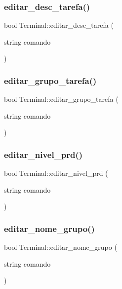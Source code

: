 \subsubsection{\texorpdfstring{editar\+\_\+desc\+\_\+tarefa()}{editar\_desc\_tarefa()}}
{\footnotesize\ttfamily bool Terminal\+::editar\+\_\+desc\+\_\+tarefa (\begin{DoxyParamCaption}\item[{string}]{comando }\end{DoxyParamCaption})}

\mbox{\label{classTerminal_a08b680a0760ae5fbab03fa2098250c7b}} 
\subsubsection{\texorpdfstring{editar\+\_\+grupo\+\_\+tarefa()}{editar\_grupo\_tarefa()}}
{\footnotesize\ttfamily bool Terminal\+::editar\+\_\+grupo\+\_\+tarefa (\begin{DoxyParamCaption}\item[{string}]{comando }\end{DoxyParamCaption})}

\mbox{\label{classTerminal_ad8941034607b656e5dcd279ce35a3f54}} 
\subsubsection{\texorpdfstring{editar\+\_\+nivel\+\_\+prd()}{editar\_nivel\_prd()}}
{\footnotesize\ttfamily bool Terminal\+::editar\+\_\+nivel\+\_\+prd (\begin{DoxyParamCaption}\item[{string}]{comando }\end{DoxyParamCaption})}

\mbox{\label{classTerminal_a542446375398d23c429e38ce92ef2855}} 
\subsubsection{\texorpdfstring{editar\+\_\+nome\+\_\+grupo()}{editar\_nome\_grupo()}}
{\footnotesize\ttfamily bool Terminal\+::editar\+\_\+nome\+\_\+grupo (\begin{DoxyParamCaption}\item[{string}]{comando }\end{DoxyParamCaption})}

